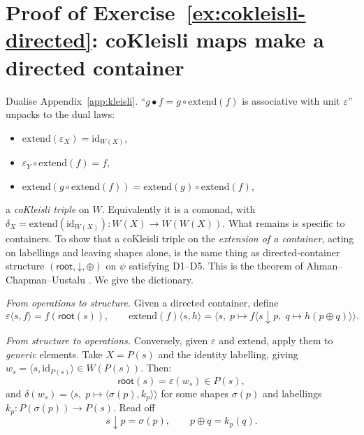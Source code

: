 \documentclass[11pt, a4paper]{article}
\theoremstyle{definition}
\theoremstyle{plain}
\newcommand{\droot}{\mathsf{root}}
\newcommand{\dsub}{\mathbin{\downarrow}}
\newcommand{\dshift}{\mathbin{\oplus}}
\begin{document}
\section{Proof of Exercise~\ref{ex:cokleisli-directed}: coKleisli
maps make a directed container}\label{app:cokleisli}

Dualise Appendix~\ref{app:kleisli}.  ``$g \bullet f = g \circ
\mathrm{extend}(f)$ is associative with unit $\varepsilon$'' unpacks
to the dual laws:
\begin{itemize}
  \item[(C1)] $\mathrm{extend}(\varepsilon_X) = \mathrm{id}_{W(X)}$,
  \item[(C2)] $\varepsilon_Y \circ \mathrm{extend}(f) = f$,
  \item[(C3)] $\mathrm{extend}(g \circ \mathrm{extend}(f)) =
    \mathrm{extend}(g) \circ \mathrm{extend}(f)$,
\end{itemize}
a \emph{coKleisli triple} on $W$.  Equivalently it is a comonad, with
$\delta_X = \mathrm{extend}(\mathrm{id}_{W(X)}) : W(X) \to W(W(X))$.
What remains is specific to containers.  To show that a coKleisli
triple on the \emph{extension of a container}, acting on labellings
and leaving shapes alone, is the same thing as directed-container
structure $(\droot, \dsub, \dshift)$ on $\psi$ satisfying D1--D5.
This is the theorem of Ahman--Chapman--Uustalu \cite{acu}.  We give
the dictionary.

\emph{From operations to structure.}  Given a directed container,
define
\[
  \varepsilon\langle s, f \rangle = f(\droot(s)),
  \qquad
  \mathrm{extend}(f)\langle s, h \rangle =
  \langle s,\; p \mapsto f\langle s \dsub p,\;
    q \mapsto h(p \dshift q)\rangle\rangle.
\]

\emph{From structure to operations.}  Conversely, given
$\varepsilon$ and $\mathrm{extend}$, apply them to \emph{generic}
elements.  Take $X = P(s)$ and the identity labelling, giving
$w_s = \langle s, \mathrm{id}_{P(s)} \rangle \in W(P(s))$.  Then:
\[
  \droot(s) = \varepsilon(w_s) \in P(s),
\]
and $\delta(w_s) = \langle s,\; p \mapsto \langle \sigma(p),
k_p \rangle \rangle$ for some shapes $\sigma(p)$ and labellings
$k_p : P(\sigma(p)) \to P(s)$.  Read off
\[
  s \dsub p = \sigma(p),
  \qquad
  p \dshift q = k_p(q).
\]
\end{document}
